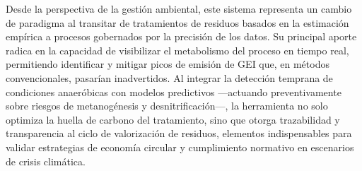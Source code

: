 Desde la perspectiva de la gestión ambiental, este sistema representa un cambio de paradigma al transitar de tratamientos de residuos basados en la estimación empírica a procesos gobernados por la precisión de los datos. Su principal aporte radica en la capacidad de visibilizar el metabolismo del proceso en tiempo real, permitiendo identificar y mitigar picos de emisión de GEI que, en métodos convencionales, pasarían inadvertidos. Al integrar la detección temprana de condiciones anaeróbicas con modelos predictivos —actuando preventivamente sobre riesgos de metanogénesis y desnitrificación—, la herramienta no solo optimiza la huella de carbono del tratamiento, sino que otorga trazabilidad y transparencia al ciclo de valorización de residuos, elementos indispensables para validar estrategias de economía circular y cumplimiento normativo en escenarios de crisis climática.
